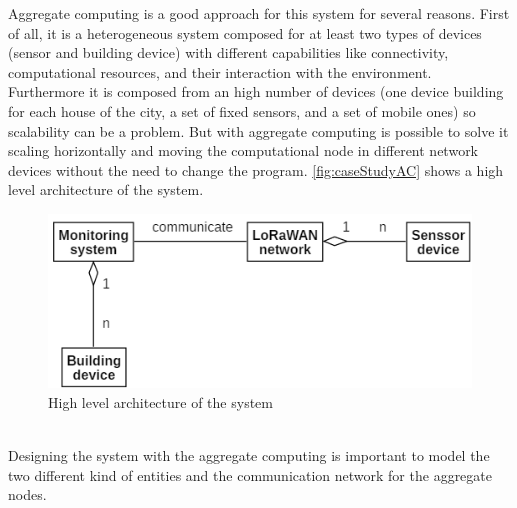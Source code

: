 Aggregate computing is a good approach for this system for several reasons.
First of all, it is a heterogeneous system composed for at least two types of devices (sensor and building device) with different capabilities like connectivity, computational resources, and their interaction with the environment. 
Furthermore it is composed from an high number of devices (one device building for each house of the city, a set of fixed sensors, and a set of mobile ones) so scalability can be a problem. But with aggregate computing is possible to solve it scaling horizontally and moving the computational node in different network devices without the need to change the program.
\autoref{fig:caseStudyAC} shows a high level architecture of the system.
\begin{figure}[h]
    \centering
    \includegraphics{figures/caseStudyB_high.png}
    \caption{High level architecture of the system}
    \label{fig:caseStudyAC}
\end{figure}
\\Designing the system with the aggregate computing is important to model the two different kind of entities and the communication network for the aggregate nodes.

